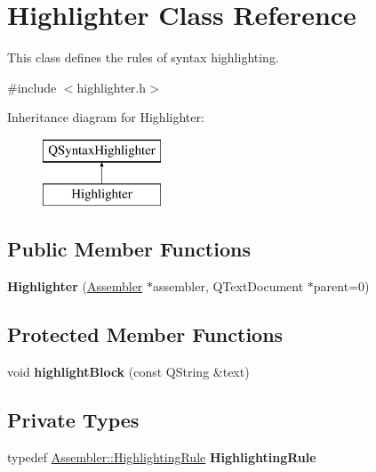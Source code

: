 \hypertarget{class_highlighter}{}\section{Highlighter Class Reference}
\label{class_highlighter}


This class defines the rules of syntax highlighting.  




{\ttfamily \#include $<$highlighter.\+h$>$}

Inheritance diagram for Highlighter\+:\begin{figure}[H]
\begin{center}
\leavevmode
\includegraphics[height=2.000000cm]{class_highlighter}
\end{center}
\end{figure}
\subsection*{Public Member Functions}
\begin{DoxyCompactItemize}
\item 
\hypertarget{class_highlighter_a5e7fcc335ddbe9516c144e2fdff46e3c}{}{\bfseries Highlighter} (\hyperlink{class_assembler}{Assembler} $\ast$assembler, Q\+Text\+Document $\ast$parent=0)\label{class_highlighter_a5e7fcc335ddbe9516c144e2fdff46e3c}

\end{DoxyCompactItemize}
\subsection*{Protected Member Functions}
\begin{DoxyCompactItemize}
\item 
\hypertarget{class_highlighter_ad07c7fd55d2ce2c675bca607b9370488}{}void {\bfseries highlight\+Block} (const Q\+String \&text)\label{class_highlighter_ad07c7fd55d2ce2c675bca607b9370488}

\end{DoxyCompactItemize}
\subsection*{Private Types}
\begin{DoxyCompactItemize}
\item 
\hypertarget{class_highlighter_aa60f8c7c52decbe57b9f5ba4705402e2}{}typedef \hyperlink{struct_assembler_1_1_highlighting_rule}{Assembler\+::\+Highlighting\+Rule} {\bfseries Highlighting\+Rule}\label{class_highlighter_aa60f8c7c52decbe57b9f5ba4705402e2}

\end{DoxyCompactItemize}
